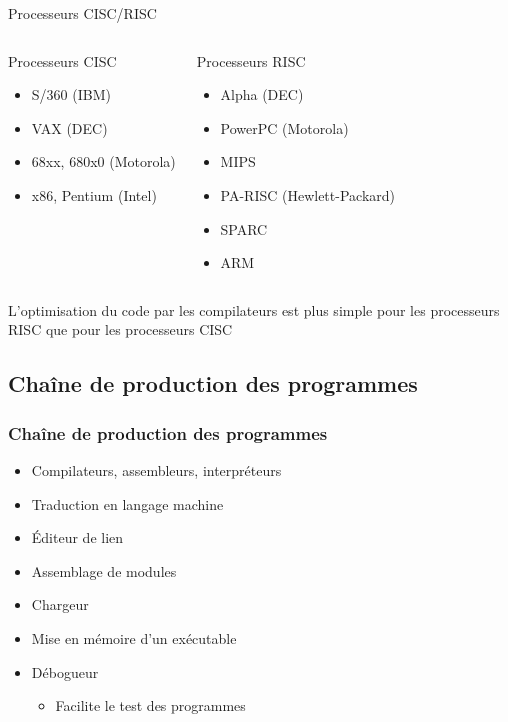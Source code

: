 \begin{frame}{Processeurs CISC/RISC}
\begin{columns}
\begin{exampleblock}{Processeurs CISC}
\begin{itemize}
\item S/360 (IBM)
\item VAX (DEC)
\item 68xx, 680x0 (Motorola)
\item x86, Pentium (Intel)
\end{itemize}

\end{exampleblock}
\begin{exampleblock}{Processeurs RISC}
\begin{itemize}
\item Alpha (DEC)
\item PowerPC (Motorola)
\item MIPS
\item PA-RISC (Hewlett-Packard)
\item SPARC
\item ARM
\end{itemize}
\end{exampleblock}
\end{columns}
\begin{center}
L'optimisation du code par les compilateurs est plus simple pour les processeurs RISC que pour les processeurs CISC
\end{center}
\end{frame}



\subsection{Chaîne de production des programmes}
\begin{frame}
\frametitle{Chaîne de production des programmes}
\begin{itemize}
\item Compilateurs, assembleurs, interpréteurs
\item Traduction en langage machine
\item Éditeur de lien
\item Assemblage de modules
\item Chargeur
\item Mise en mémoire d’un exécutable
\item Débogueur
\begin{itemize}
\item Facilite le test des programmes
\end{itemize}
\end{itemize}
\end{frame}


